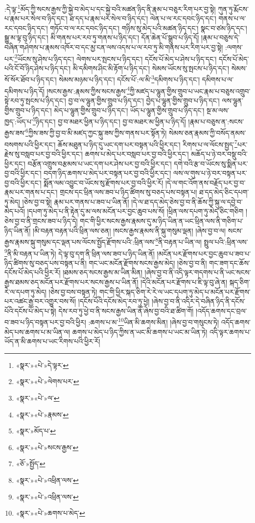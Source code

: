 :དེ་ལྟ་\footnote{«སྣར་»«པེ་»དེ་ལྟར་}མོད་ཀྱི་སངས་རྒྱས་ཀྱི་སྐྱེ་བ་མེད་པ་དང་སྐྱེ་བའི་མཚན་ཉིད་ནི་རྣམ་པ་བཅུར་རིག་པར་བྱ་སྟེ། ཀུན་ཏུ་རྨོངས་པ་རྣམ་པར་སེལ་བ་ཉིད་དང་། ཐ་དད་པ་རྣམ་པར་སེལ་བ་ཉིད་དང་། ལེན་པ་ལ་རང་དབང་ཉིད་དང་། གནས་པ་ལ་རང་དབང་ཉིད་དང་། གཏོང་བ་ལ་རང་དབང་ཉིད་དང་། གཉིས་སུ་མེད་པའི་མཚན་ཉིད་དང་། སྣང་བ་ཙམ་ཉིད་དང་། སྒྱུ་མ་ལྟ་བུ་ཉིད་དང་། མི་གནས་པར་རབ་ཏུ་གནས་པ་ཉིད་དང་། དོན་ཆེན་པོ་སྒྲུབ་པ་ཉིད་དོ། །རྣམ་པ་བཅུས་དེ་བཞིན་གཤེགས་པ་རྣམས་འཁོར་བ་དང་མྱ་ངན་ལས་འདས་པ་ལ་རབ་ཏུ་མི་གནས་པར་རིག་པར་བྱ་སྟེ། :ལགས་པར་\footnote{«སྣར་»«པེ་»ལེགས་པར་}ཡོངས་སུ་ཤེས་པ་ཉིད་དང་། ལེགས་པར་སྤངས་པ་ཉིད་དང་། དངོས་པོ་མེད་པ་ཤེས་པ་ཉིད་དང་། དངོས་པོ་མེད་པའི་ངོ་བོ་ཉིད་ཤེས་པ་ཉིད་དང་། མི་དམིགས་ཤིང་མི་རྟོག་པ་ཉིད་དང་། སེམས་ཡོངས་སུ་སྤངས་པ་ཉིད་དང་། སེམས་སོ་སོར་ཐོབ་པ་ཉིད་དང་། སེམས་མཉམ་པ་ཉིད་དང་། དངོས་པོ་:ལ་མི་\footnote{«སྣར་»«པེ་»ལ་}དམིགས་པ་ཉིད་དང་། དམིགས་པ་ལ་དམིགས་པ་ཉིད་དོ། །སངས་རྒྱས་:རྣམས་ཀྱིས་སངས་རྒྱས་\footnote{«སྣར་»«པེ་»རྣམས་}ཀྱི་མཛད་པ་ལྷུན་གྱིས་གྲུབ་པ་ཡང་རྣམ་པ་བཅུས་འགྲུབ་སྟེ་རབ་ཏུ་སྤངས་པ་ཉིད་དང་། བྱ་བ་ལ་ལྷུན་གྱིས་གྲུབ་པ་ཉིད་དང་། བྱེད་པ་ལྷུན་གྱིས་གྲུབ་པ་ཉིད་དང་། ལས་ལྷུན་གྱིས་གྲུབ་པ་ཉིད་དང་། མེད་པ་ལྷུན་གྱིས་གྲུབ་པ་ཉིད་དང་། ཡོད་པ་ལྷུན་གྱིས་གྲུབ་པ་ཉིད་དང་། སྔ་མ་ལས་ཁྱད་:ཡོད་པ་\footnote{«སྣར་»མོད་པ་}ཉིད་དང་། བྱ་བ་མཐར་ཕྱིན་པ་ཉིད་དང་། བྱ་བ་མཐར་མ་ཕྱིན་པ་ཉིད་དོ། །རྣམ་པ་བཅུས་ན་:སངས་རྒྱས་ཟས་\footnote{«སྣར་»«པེ་»སངས་རྒྱས་}ཀྱིས་ཟས་ཀྱི་བྱ་བ་མི་མཛད་ཀྱང་སྐུ་ཟས་ཀྱིས་གནས་པར་སྟོན་ཏེ། སེམས་ཅན་རྣམས་ཀྱི་བསོད་ནམས་བསགས་པའི་ཕྱིར་དང་། ཆོས་མཐུན་པ་ཉིད་དུ་ཡང་དག་པར་བསྟན་པའི་ཕྱིར་དང་། རིགས་པ་ལ་ལོངས་སྤྱད་\footnote{«ཅོ་»སྤྱོད་}པར་རྗེས་སུ་བསླབ་པར་བྱ་བའི་ཕྱིར་དང་། ཆགས་པ་མེད་པར་བསླབ་པར་བྱ་བའི་ཕྱིར་དང་། མཆོད་པ་ཉེ་བར་བསྡུ་བའི་ཕྱིར་དང་། བརྩོན་འགྲུས་བརྩམས་པ་ཡང་དག་པར་ཤེས་པར་བྱ་བའི་ཕྱིར་དང་། དགེ་བའི་རྩ་བ་ཡོངས་སུ་སྨིན་པར་བྱ་བའི་ཕྱིར་དང་། བདག་ཉིད་ཆགས་པ་མེད་པར་བསྟན་པར་བྱ་བའི་ཕྱིར་དང་། ལས་ལ་གུས་པ་ཉེ་བར་བསྟན་པར་བྱ་བའི་ཕྱིར་དང་། སྨོན་ལམ་འབྱུང་བ་ཡོངས་སུ་རྫོགས་པར་བྱ་བའི་ཕྱིར་རོ། །དེ་ལ་གང་འོག་ནས་བརྗོད་པར་བྱ་བ་རྣམ་པར་གནས་པ་དང་། གྲངས་དང་ཕྲིན་ལས་ཟབ་པ་ཉིད་ཚིགས་སུ་བཅད་པས་བསྟན་པ། ཐ་དད་མེད་ཅིང་དཔག་ཏུ་མེད། །ཅེས་བྱ་བ་སྟེ། རྣམ་པར་གནས་པ་ཟབ་པ་ཡིན་ནོ། །དེ་ལ་ཐ་དད་མེད་ཅེས་བྱ་བ་ནི་ཆོས་ཀྱི་སྐུ་ལ་དབྱེ་བ་མེད་པའོ། །དཔག་ཏུ་མེད་པ་ནི་རྟེན་དུ་མ་ལས་མངོན་པར་བྱང་ཆུབ་པས་སོ། །ཕྲིན་ལས་དཔག་ཏུ་མེད་ཅིང་གཅིག །ཅེས་བྱ་བ་ནི་གྲངས་ཟབ་པ་ཉིད་དེ། གང་གི་ཕྱིར་སངས་རྒྱས་རྣམས་དུ་མ་ཉིད་ཡིན་ན་ཡང་ཕྲིན་ལས་ནི་གཅིག་པ་ཉིད་ཡིན་ནོ། །མི་བརྟན་བརྟན་པའི་ཕྲིན་ལས་ཅན། །སངས་རྒྱས་རྣམས་ནི་སྐུ་གསུམ་ལྡན། །ཞེས་བྱ་བ་ལ། སངས་རྒྱས་རྣམས་སྐུ་གསུམ་དང་ལྡན་པས་ལོངས་སྤྱོད་རྫོགས་པའི་:ཕྲིན་ལས་\footnote{«སྣར་»«པེ་»འཕྲིན་ལས་}ནི་བརྟན་པ་ཡིན་ལ། སྤྲུལ་པའི་:ཕྲིན་ལས་\footnote{«སྣར་»«པེ་»འཕྲིན་ལས་}ནི་མི་བརྟན་པ་ཡིན་ཏེ། དེ་ལྟ་བུ་དག་ནི་ཕྲིན་ལས་ཟབ་པ་ཉིད་ཡིན་ནོ། །མངོན་པར་རྫོགས་པར་བྱང་ཆུབ་པ་ཟབ་པ་ཉིད་ཚིགས་སུ་བཅད་པས་བསྟན་པ་ནི། གང་ཡང་མངོན་རྫོགས་སངས་རྒྱས་མེད། །ཅེས་བྱ་བ་ནི། གང་ཟག་དང་ཆོས་དངོས་པོ་མེད་པའི་ཕྱིར་རོ། །ཐམས་ཅད་སངས་རྒྱས་མ་ཡིན་མིན། །ཞེས་བྱ་བ་ནི་འདི་ལྟར་གདགས་པ་ནི་ཡང་སངས་རྒྱས་ཐམས་ཅད་མངོན་པར་རྫོགས་པར་སངས་རྒྱས་པ་ཡིན་ནོ། །དེའི་མངོན་པར་རྫོགས་པ་ཇི་ལྟ་བུ་ཞེ་ན། སྐད་ཅིག་རེ་ལ་དཔག་ཏུ་མེད། །ཅེས་བྱ་བས་བསྟན་ཏེ། གང་གི་ཕྱིར་སྐད་ཅིག་རེ་རེ་ལ་ཡང་དཔག་ཏུ་མེད་པ་མངོན་པར་རྫོགས་པར་འཚང་རྒྱ་བར་འགྱུར་བས་སོ། །དངོས་པོའི་དངོས་མེད་རབ་ཏུ་ཕྱེ། །ཞེས་བྱ་བ་ནི་འདིར་དེ་བཞིན་ཉིད་ནི་དངོས་པོའི་དངོས་པོ་མེད་པ་སྟེ། དེས་རབ་ཏུ་ཕྱེ་བ་ནི་སངས་རྒྱས་ཡིན་ནོ་ཞེས་བྱ་བའི་ཐ་ཚིག་གོ། །འདོད་ཆགས་དང་བྲལ་བ་ཟབ་པ་ཉིད་བསྟན་པར་བྱ་བའི་ཕྱིར། :ཆགས་པ་མ་\footnote{«སྣར་»«པེ་»ཆགས་པ་མེད་}ཡིན་མི་ཆགས་མིན། །ཞེས་བྱ་བ་གསུངས་ཏེ། འདོད་ཆགས་མེད་པས་ཆགས་པ་མ་ཡིན་ལ། ཆགས་པ་མེད་པ་ཉིད་ཀྱིས་ན་ཡང་མི་ཆགས་པ་ཡང་མ་ཡིན་ཏེ། འདི་ལྟར་ཆགས་པ་ཡོད་ན་མི་ཆགས་པ་ཡང་རིགས་པའི་ཕྱིར་རོ། 